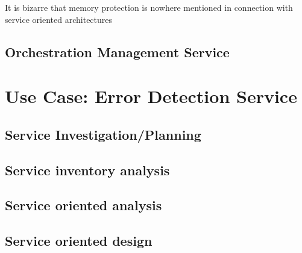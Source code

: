 It is bizarre that memory protection is nowhere mentioned in connection with service oriented architectures 


\subsection{Orchestration Management Service}

\section{Use Case: Error Detection Service}
\subsection{Service Investigation/Planning}
\subsection{Service inventory analysis}
\subsection{Service oriented analysis}
\subsection{Service oriented design}